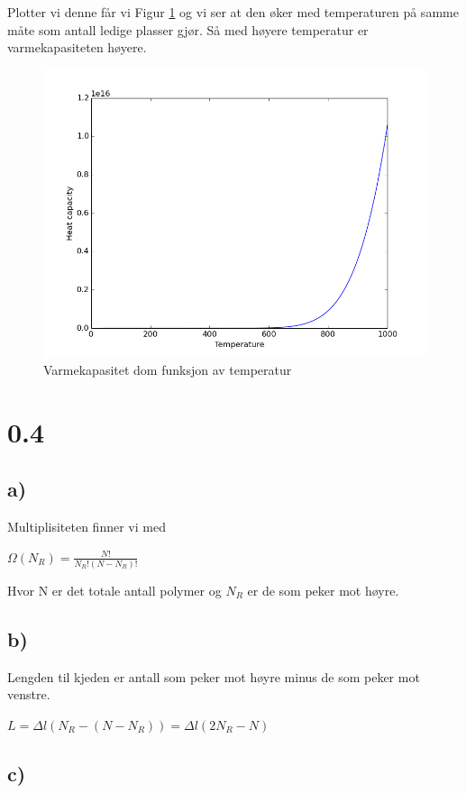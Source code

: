 \documentclass[12pt]{article}
\begin{document}
Plotter vi denne får vi Figur \ref{heat} og vi ser at den øker med temperaturen på samme måte som antall ledige plasser gjør. Så med høyere temperatur er varmekapasiteten høyere. 

\begin{figure}[hb!]
\includegraphics[width = \textwidth]{heatcap}
\caption{Varmekapasitet dom funksjon av temperatur}
\label{heat}
\end{figure}

\section*{0.4}

\subsection*{a)}

Multiplisiteten finner vi med 

$\Omega(N_R) = \frac{N!}{N_R!(N-N_R)!}$

Hvor N er det totale antall polymer og $N_R$ er de som peker mot høyre. 

\subsection*{b)}

Lengden til kjeden er antall som peker mot høyre minus de som peker mot venstre. 

$L = \Delta l (N_R -(N-N_R)) = \Delta l (2N_R -N)$

\subsection*{c)}
\end{document}
